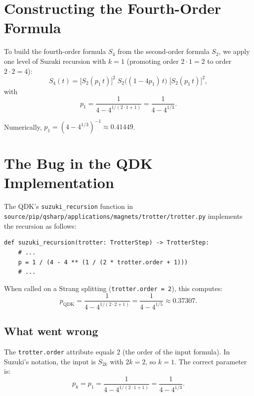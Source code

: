 \documentclass[11pt]{article}
\begin{document}
\section{Constructing the Fourth-Order Formula}

To build the fourth-order formula $S_4$ from the second-order formula $S_2$, we
apply one level of Suzuki recursion with $k = 1$ (promoting order $2 \cdot 1 = 2$
to order $2 \cdot 2 = 4$):
\begin{equation}\label{eq:S4}
  S_4(t) = \bigl[S_2(p_1\, t)\bigr]^2\;
           S_2\!\bigl((1-4p_1)\, t\bigr)\;
           \bigl[S_2(p_1\, t)\bigr]^2,
\end{equation}
with
\begin{equation}\label{eq:p1}
  p_1 = \frac{1}{4 - 4^{1/(2 \cdot 1 + 1)}} = \frac{1}{4 - 4^{1/3}}.
\end{equation}

\noindent
Numerically, $p_1 = (4 - 4^{1/3})^{-1} \approx 0.41449$.

\section{The Bug in the QDK Implementation}

The QDK's \texttt{suzuki\_recursion} function in
\texttt{source/pip/qsharp/applications/magnets/trotter/trotter.py}
implements the recursion as follows:

\begin{lstlisting}
def suzuki_recursion(trotter: TrotterStep) -> TrotterStep:
    # ...
    p = 1 / (4 - 4 ** (1 / (2 * trotter.order + 1)))
    # ...
\end{lstlisting}

When called on a Strang splitting (\texttt{trotter.order = 2}), this computes:
\begin{equation}\label{eq:qdk_p}
  p_{\text{QDK}} = \frac{1}{4 - 4^{1/(2 \cdot 2 + 1)}} = \frac{1}{4 - 4^{1/5}}
  \approx 0.37307.
\end{equation}

\subsection{What went wrong}

The \texttt{trotter.order} attribute equals $2$ (the order of the input
formula).  In Suzuki's notation, the input is $S_{2k}$ with $2k = 2$, so $k =
1$.  The correct parameter is:
\begin{equation}
  p_k = p_1 = \frac{1}{4 - 4^{1/(2 \cdot 1 + 1)}} = \frac{1}{4 - 4^{1/3}}.
\end{equation}
\end{document}
